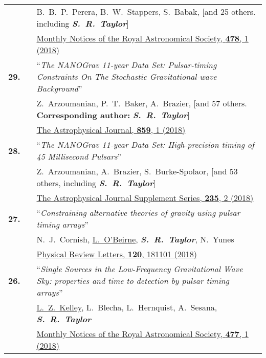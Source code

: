 \documentclass[11pt,letterpaper,sans]{moderncv}
\begin{document}
{\begin{longtable}{rp{0.3cm}p{15.8cm}}
&&B.~B.~P.~Perera, B.~W.~Stappers, S.~Babak, [and 25 others. including \textit{\textbf{S.~R.~Taylor}}]\\
&& \href{https://academic.oup.com/mnras/article-abstract/478/1/218/4990951?redirectedFrom=fulltext}{{\color{color1} Monthly Notices of the Royal Astronomical Society, \textbf{478}, 1 (2018)}}  \vspace{0.09cm}\\
\textbf{29.} & & ``\textit{The NANOGrav 11-year Data Set: Pulsar-timing Constraints On The Stochastic Gravitational-wave Background}'' \\ 
&&Z.~Arzoumanian, P.~T.~Baker, A.~Brazier, [and 57 others. \textbf{Corresponding author:} \textit{\textbf{S.~R.~Taylor}}]\\
&& \href{http://iopscience.iop.org/article/10.3847/1538-4357/aabd3b/meta}{{\color{color1} The Astrophysical Journal, \textbf{859}, 1 (2018)}}  \vspace{0.09cm}\\
\textbf{28.} & & ``\textit{The NANOGrav 11-year Data Set: High-precision timing of 45 Millisecond Pulsars}'' \\ 
&&Z.~Arzoumanian, A.~Brazier, S.~Burke-Spolaor, [and 53 others, including \textit{\textbf{S.~R.~Taylor}}]\\
&& \href{http://iopscience.iop.org/article/10.3847/1538-4365/aab5b0/meta}{{\color{color1} The Astrophysical Journal Supplement Series, \textbf{235}, 2 (2018)}}  \vspace{0.09cm}\\
\textbf{27.} & & ``\textit{Constraining alternative theories of gravity using pulsar timing arrays}'' \\ 
&&N.~J.~Cornish, \underline{L.~O'Beirne}, \textit{\textbf{S.~R.~Taylor}}, N.~Yunes\\
&& \href{https://journals.aps.org/prl/abstract/10.1103/PhysRevLett.120.181101}{{\color{color1} Physical Review Letters, \textbf{120}, 181101 (2018)}}  \vspace{0.09cm}\\
\textbf{26.} & & ``\textit{Single Sources in the Low-Frequency Gravitational Wave Sky: properties and time to detection by pulsar timing arrays}'' \\ 
&&\underline{L.~Z.~Kelley}, L.~Blecha, L.~Hernquist, A.~Sesana, \textit{\textbf{S.~R.~Taylor}} \\
&& \href{https://academic.oup.com/mnras/article-abstract/477/1/964/4937809?redirectedFrom=fulltext}{{\color{color1} Monthly Notices of the Royal Astronomical Society, \textbf{477}, 1 (2018)}}  \vspace{0.09cm}\\

\end{longtable}}
\end{document}
